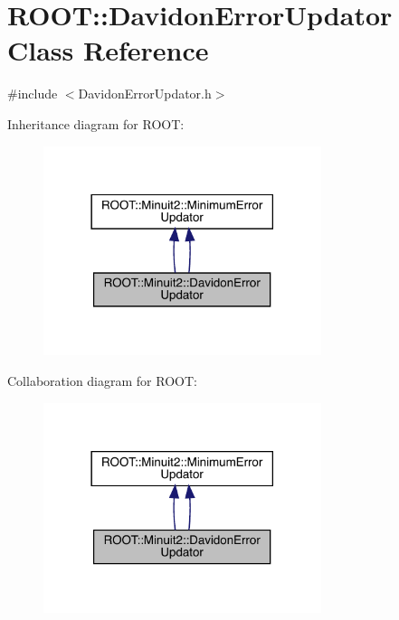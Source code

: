 \hypertarget{classROOT_1_1Minuit2_1_1DavidonErrorUpdator}{}\section{R\+O\+OT\+:\+:Davidon\+Error\+Updator Class Reference}
\label{classROOT_1_1Minuit2_1_1DavidonErrorUpdator}


{\ttfamily \#include $<$Davidon\+Error\+Updator.\+h$>$}



Inheritance diagram for R\+O\+OT\+:\nopagebreak
\begin{figure}[H]
\begin{center}
\leavevmode
\includegraphics[width=230pt]{d3/dd6/classROOT_1_1Minuit2_1_1DavidonErrorUpdator__inherit__graph}
\end{center}
\end{figure}


Collaboration diagram for R\+O\+OT\+:\nopagebreak
\begin{figure}[H]
\begin{center}
\leavevmode
\includegraphics[width=230pt]{d0/dba/classROOT_1_1Minuit2_1_1DavidonErrorUpdator__coll__graph}
\end{center}
\end{figure}
